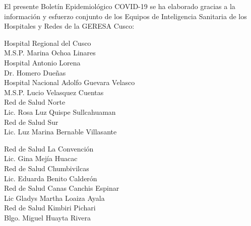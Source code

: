 \documentclass[12pt,a4paper,openany]{book}
\begin{document}
	\centering
	{\large El presente Boletín Epidemiológico COVID-19 se ha elaborado gracias a la información y esfuerzo conjunto de los Equipos de Inteligencia Sanitaria de los Hospitales y Redes de la GERESA Cusco:
		
		\vspace{0.5cm}
		\noindent
		\begin{minipage}[t]{.45\textwidth}
			\centering
			Hospital Regional del Cusco \\
			M.S.P. Marina Ochoa Linares \vspace{0.5cm}\\
			Hospital Antonio Lorena \\
			Dr. Homero Dueñas \vspace{.5cm}\\
			Hospital Nacional Adolfo Guevara Velasco\\
			M.S.P. Lucio Velasquez Cuentas \vspace{.5cm}\\
			Red de Salud Norte \\
			Lic. Rosa Luz Quispe Sullcahuaman \vspace{0.5cm}\\
			Red de Salud Sur\\
			Lic. Luz Marina Bernable Villasante \vspace{0.5cm}\\	
		\end{minipage}
		\hfill
		\noindent
		\begin{minipage}[t]{.45\textwidth}
			\centering
			Red de Salud La Convención\\
			Lic. Gina Mejía Huacac\vspace{0.5cm}\\
			Red de Salud Chumbivilcas\\
			Lic. Eduarda Benito Calderón \vspace{.5cm}\\
			Red de Salud Canas Canchis Espinar\\
			Lic Gladys Martha Loaiza Ayala \vspace{.5cm}\\
			Red de Salud Kimbiri Pichari \\
			Blgo. Miguel Huayta Rivera\vspace{0.5cm}\\	
		\end{minipage}
}
\end{document}
